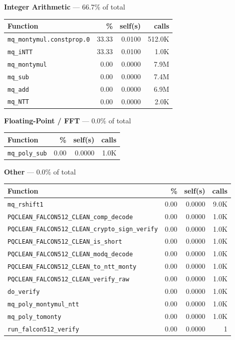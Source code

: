 \documentclass[11pt,a4paper]{article}
\begin{document}
\noindent\colorbox{intcolor}{\strut \textbf{Integer Arithmetic} --- 66.7\% of total}
\vspace{2pt}

\begin{longtable}{p{7.5cm}rrr}
\toprule
Function & \% & self(s) & calls \\
\midrule
\endhead
  \texttt{mq\_montymul.constprop.0} & 33.33 & 0.0100 & 512.0K \\
  \texttt{mq\_iNTT} & 33.33 & 0.0100 & 1.0K \\
  \texttt{mq\_montymul} & 0.00 & 0.0000 & 7.9M \\
  \texttt{mq\_sub} & 0.00 & 0.0000 & 7.4M \\
  \texttt{mq\_add} & 0.00 & 0.0000 & 6.9M \\
  \texttt{mq\_NTT} & 0.00 & 0.0000 & 2.0K \\
\bottomrule
\end{longtable}

\noindent\colorbox{fpcolor}{\strut \textbf{Floating-Point / FFT} --- 0.0\% of total}
\vspace{2pt}

\begin{longtable}{p{7.5cm}rrr}
\toprule
Function & \% & self(s) & calls \\
\midrule
\endhead
  \texttt{mq\_poly\_sub} & 0.00 & 0.0000 & 1.0K \\
\bottomrule
\end{longtable}

\noindent\colorbox{othercolor}{\strut \textbf{Other} --- 0.0\% of total}
\vspace{2pt}

\begin{longtable}{p{7.5cm}rrr}
\toprule
Function & \% & self(s) & calls \\
\midrule
\endhead
  \texttt{mq\_rshift1} & 0.00 & 0.0000 & 9.0K \\
  \texttt{PQCLEAN\_FALCON512\_CLEAN\_comp\_decode} & 0.00 & 0.0000 & 1.0K \\
  \texttt{PQCLEAN\_FALCON512\_CLEAN\_crypto\_sign\_verify} & 0.00 & 0.0000 & 1.0K \\
  \texttt{PQCLEAN\_FALCON512\_CLEAN\_is\_short} & 0.00 & 0.0000 & 1.0K \\
  \texttt{PQCLEAN\_FALCON512\_CLEAN\_modq\_decode} & 0.00 & 0.0000 & 1.0K \\
  \texttt{PQCLEAN\_FALCON512\_CLEAN\_to\_ntt\_monty} & 0.00 & 0.0000 & 1.0K \\
  \texttt{PQCLEAN\_FALCON512\_CLEAN\_verify\_raw} & 0.00 & 0.0000 & 1.0K \\
  \texttt{do\_verify} & 0.00 & 0.0000 & 1.0K \\
  \texttt{mq\_poly\_montymul\_ntt} & 0.00 & 0.0000 & 1.0K \\
  \texttt{mq\_poly\_tomonty} & 0.00 & 0.0000 & 1.0K \\
  \texttt{run\_falcon512\_verify} & 0.00 & 0.0000 & 1 \\
\bottomrule
\end{longtable}
\end{document}
